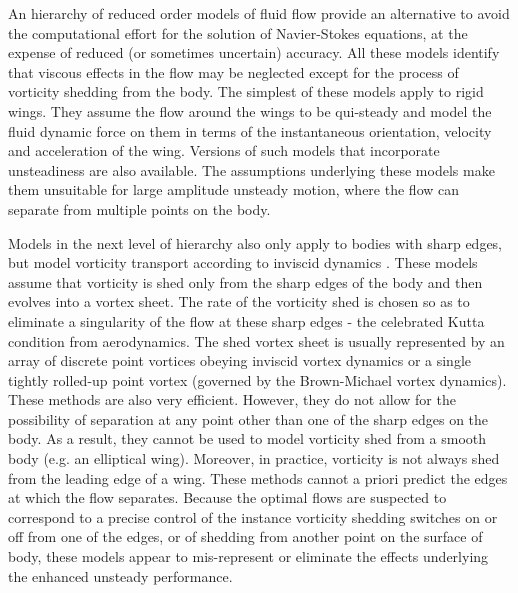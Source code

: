 An hierarchy of reduced order models of fluid flow provide an alternative to avoid the computational effort for the solution of Navier-Stokes equations, at the expense of reduced (or sometimes uncertain) accuracy.
All these models identify that viscous effects in the flow may be neglected except for the process of vorticity shedding from the body.
The simplest of these models \cite{tanabe1994behavior,mahadevan1996tumbling,belmonte1998flutter,mahadevan1999tumbling,pesavento2004falling,andersen2005unsteady} apply to rigid wings.
They assume the flow around the wings to be qui-steady and model the fluid dynamic force on them in terms of the instantaneous orientation, velocity and acceleration of the wing.
Versions of such models that incorporate unsteadiness \cite{hansen2004beddoes,brunton2013empirical} are also available.
The assumptions underlying these models make them unsuitable for large amplitude unsteady motion, where the flow can separate from multiple points on the body.

Models in the next level of hierarchy also only apply to bodies with sharp edges, but model vorticity transport according to inviscid dynamics \cite{pedley1999large,jones2005falling,shukla2007inviscid,singh2008hydrodynamics,alben2009simulating,michelin2009unsteady,michelin2010falling,sheng2012simulating}.
These models assume that vorticity is shed only from the sharp edges of the body and then evolves into a vortex sheet.
The rate of the vorticity shed is chosen so as to eliminate a singularity of the flow at these sharp edges - the celebrated Kutta condition from aerodynamics.
The shed vortex sheet is usually represented by an array of discrete point vortices obeying inviscid vortex dynamics or a single tightly rolled-up point vortex (governed by the Brown-Michael vortex dynamics).
These methods are also very efficient.
However, they do not allow for the possibility of separation at any point other than one of the sharp edges on the body.
As a result, they cannot be used to model vorticity shed from a smooth body (e.g. an elliptical wing).
Moreover, in practice, vorticity is not always shed from the leading edge of a wing.
These methods cannot a priori predict the edges at which the flow separates.
Because the optimal flows are suspected to correspond to a precise control of the instance vorticity shedding switches on or off from one of the edges, or of shedding from another point on the surface of body, these models appear to mis-represent or eliminate the effects underlying the enhanced unsteady performance.

